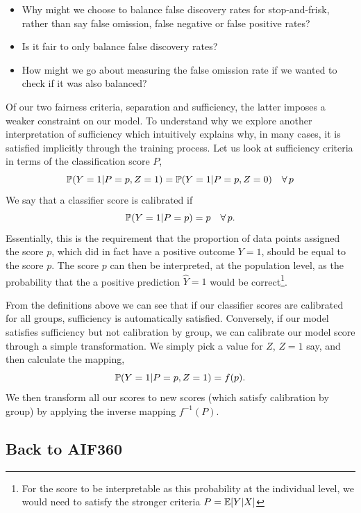 \begin{lookbox}
\begin{itemize}
\item Why might we choose to balance false discovery rates for stop-and-frisk, rather than say false omission, false negative or false positive rates?
\item Is it fair to only balance false discovery rates?
\item How might we go about measuring the false omission rate if we wanted to check if it was also balanced?
\end{itemize}
\end{lookbox}

Of our two fairness criteria, separation and sufficiency, the latter imposes a weaker constraint on our model. To understand why we explore another interpretation of sufficiency which intuitively explains why, in many cases, it is satisfied implicitly through the training process\cite{ImplicitFairness}. Let us look at sufficiency criteria in terms of the classification score $P$,
\[
\mathbb{P}(Y=1 | P=p, Z=1) = \mathbb{P}(Y=1 | P=p, Z=0) \quad \forall \, p
\]
We say that a classifier score is calibrated if
\[
\mathbb{P}(Y=1 | P=p) = p \quad \forall \, p. 
\]
Essentially, this is the requirement that the proportion of data points assigned the score $p$, which did in fact have a positive outcome $Y=1$, should be equal to the score $p$. The score $p$ can then be interpreted, at the population level, as the probability that the a positive prediction $\hat{Y}=1$ would be correct\footnote{For the score to be interpretable as this probability at the individual level, we would need to satisfy the stronger criteria $P=\mathbb{E}[Y|X]$}.

From the definitions above we can see that if our classifier scores are calibrated for all groups, sufficiency is automatically satisfied. Conversely, if our model satisfies sufficiency but not calibration by group, we can calibrate our model score through a simple transformation. We simply pick a value for $Z$, $Z=1$ say, and then calculate the mapping,
\[
\mathbb{P}(Y=1|P=p, Z=1) = f(p).
\]
We then transform all our scores to new scores (which satisfy calibration by group) by applying the inverse mapping $f^{-1}(P)$.

\subsection{Back to AIF360}

